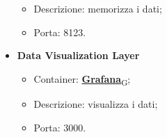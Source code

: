 \begin{itemize}
\begin{itemize}
            \item Descrizione: memorizza i dati;
            \item Porta: 8123.
        \end{itemize}
    \item \textbf{Data Visualization Layer}
        \begin{itemize}
            \item Container: \href{https://7last.github.io/docs/pb/documentazione-interna/glossario\#grafana}{\textbf{Grafana}\textsubscript{G}};
            \item Descrizione: visualizza i dati;
            \item Porta: 3000.
        \end{itemize}
\end{itemize}

